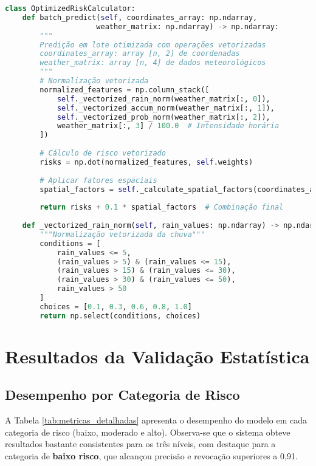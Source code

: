 \begin{lstlisting}[caption={Otimização com NumPy e Vectorização},label={cod:otimizacao},language=Python]
class OptimizedRiskCalculator:
    def batch_predict(self, coordinates_array: np.ndarray, 
                     weather_matrix: np.ndarray) -> np.ndarray:
        """
        Predição em lote otimizada com operações vetorizadas
        coordinates_array: array [n, 2] de coordenadas
        weather_matrix: array [n, 4] de dados meteorológicos
        """
        # Normalização vetorizada
        normalized_features = np.column_stack([
            self._vectorized_rain_norm(weather_matrix[:, 0]),
            self._vectorized_accum_norm(weather_matrix[:, 1]),
            self._vectorized_prob_norm(weather_matrix[:, 2]),
            weather_matrix[:, 3] / 100.0  # Intensidade horária
        ])
        
        # Cálculo de risco vetorizado
        risks = np.dot(normalized_features, self.weights)
        
        # Aplicar fatores espaciais
        spatial_factors = self._calculate_spatial_factors(coordinates_array)
        
        return risks + 0.1 * spatial_factors  # Combinação final
    
    def _vectorized_rain_norm(self, rain_values: np.ndarray) -> np.ndarray:
        """Normalização vetorizada da chuva"""
        conditions = [
            rain_values <= 5,
            (rain_values > 5) & (rain_values <= 15),
            (rain_values > 15) & (rain_values <= 30),
            (rain_values > 30) & (rain_values <= 50),
            rain_values > 50
        ]
        choices = [0.1, 0.3, 0.6, 0.8, 1.0]
        return np.select(conditions, choices)
\end{lstlisting}

\section{Resultados da Validação Estatística}

\subsection{Desempenho por Categoria de Risco}

A Tabela \ref{tab:metricas_detalhadas} apresenta o desempenho do modelo em cada categoria de risco (baixo, moderado e alto). Observa-se que o sistema obteve resultados bastante consistentes para os três níveis, com destaque para a categoria de \textbf{baixo risco}, que alcançou precisão e revocação superiores a 0,91.  

